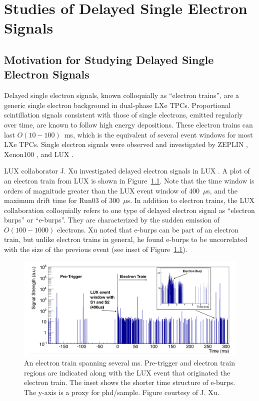 \chapter{Studies of Delayed Single Electron Signals}
\label{ch:etrains} 

\section{Motivation for Studying Delayed Single Electron Signals}
Delayed single electron signals, known colloquially as ``electron trains'', are a generic single electron background in dual-phase \ac{LXe} \ac{TPC}s. Proportional scintillation signals consistent with those of single electrons, emitted regularly over time, are known to follow high energy depositions. These electron trains can last $O(10-100)$~ms, which is the equivalent of several event windows for most \ac{LXe} \ac{TPC}s. Single electron signals were observed and investigated by ZEPLIN \cite{Edwards2008} \cite{Santos2011}, Xenon100 \cite{Aprile2014}, and LUX \cite{Xu2016}. 

\ac{LUX} collaborator J. Xu investigated delayed electron signals in \ac{LUX} \cite{Xu2016}. A plot of an electron train from \ac{LUX} is shown in Figure~\ref{fig:lux_etrain}. Note that the time window is orders of magnitude greater than the \ac{LUX} event window of 400~$\mu$s, and the maximum drift time for Run03 of 300~$\mu$s. In addition to electron trains, the \ac{LUX} collaboration colloquially refers to one type of delayed electron signal as ``electron burps'' or ``e-burps''. They are characterized by the sudden emission of $O(100-1000)$ electrons. Xu noted that e-burps can be part of an electron train, but unlike electron trains in general, he found e-burps to be uncorrelated with the size of the previous event (see inset of Figure~\ref{fig:lux_etrain}). 

\begin{figure}[htbp]
\begin{center}
\includegraphics[width=\textwidth]{figures/etrains/lux_etrain_eburp.png}
\caption{An electron train spanning several ms. Pre-trigger and electron train regions are indicated along with the \acs{LUX} event that originated the electron train. The inset shows the shorter time structure of e-burps. The y-axis is a proxy for phd/sample. Figure courtesy of J. Xu. }
\label{fig:lux_etrain}
\end{center}
\end{figure}


